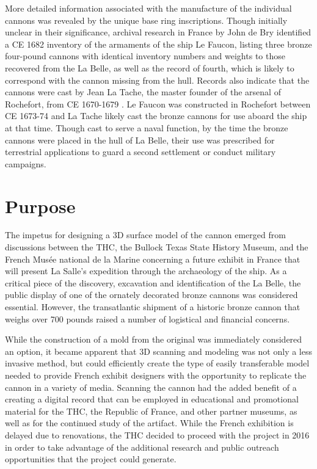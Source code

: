 \documentclass[review]{elsarticle}
\begin{document}
More detailed information associated with the manufacture of the individual cannons was revealed by the unique base ring inscriptions. Though initially unclear in their significance, archival research in France by John de Bry identified a CE 1682 inventory of the armaments of the ship Le Faucon, listing three bronze four-pound cannons with identical inventory numbers and weights to those recovered from the La Belle, as well as the record of fourth, which is likely to correspond with the cannon missing from the hull. Records also indicate that the cannons were cast by Jean La Tache, the master founder of the arsenal of Rochefort, from CE 1670-1679 \citep[356-357]{RN5763}. Le Faucon was constructed in Rochefort between CE 1673-74 and La Tache likely cast the bronze cannons for use aboard the ship at that time. Though cast to serve a naval function, by the time  the bronze cannons were placed in the hull of La Belle, their use was prescribed for terrestrial applications to guard a second settlement or conduct military campaigns.

\section*{Purpose}

The impetus for designing a 3D surface model of the cannon emerged from discussions between the THC, the Bullock Texas State History Museum, and the French Musée national de la Marine concerning a future exhibit in France that will present La Salle's expedition through the archaeology of the ship. As a critical piece of the discovery, excavation and identification of the La Belle, the public display of one of the ornately decorated bronze cannons was considered essential. However, the transatlantic shipment of a historic bronze cannon that weighs over 700 pounds raised a number of logistical and financial concerns. 

While the construction of a mold from the original was immediately considered an option, it became apparent that 3D scanning and modeling was not only a less invasive method, but could efficiently create the type of easily transferable model needed to provide French exhibit designers with the opportunity to replicate the cannon in a variety of media. Scanning the cannon had the added benefit of a creating a digital record that can be employed in educational and promotional material for the THC, the Republic of France, and other partner museums, as well as for the continued study of the artifact. While the French exhibition is delayed due to renovations, the THC decided to proceed with the project in 2016 in order to take advantage of the additional research and public outreach opportunities that the project could generate.
\end{document}
